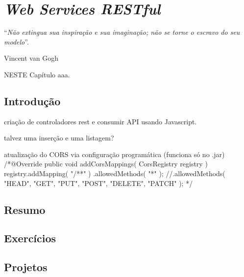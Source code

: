 \chapter{\textit{Web Services RESTful}}\label{cap:webservicesRestful}
\epigraph{``\textit{Não extingua sua inspiração e sua imaginação; não se torne o escravo do seu modelo}''.}{Vincent van Gogh}

\lettrine[lines=4, lhang=0.1, lraise=0, loversize=0.2, findent=0.1em]{\textcolor{corTema}{N}}{ESTE} Capítulo aaa.

\vfill

\section{Introdução}

criação de controladores rest e consumir API usando Javascript.

talvez uma inserção e uma listagem?

atualização do CORS via configuração programática (funciona só no .jar)
/*@Override
    public void addCorsMappings( CorsRegistry registry ) {
        registry.addMapping( "/**" )
                .allowedMethods( "*" );
                //.allowedMethods( "HEAD", "GET", "PUT", "POST", "DELETE", "PATCH" );
    }*/

\section{Resumo}

\section{Exercícios}

\section{Projetos}

